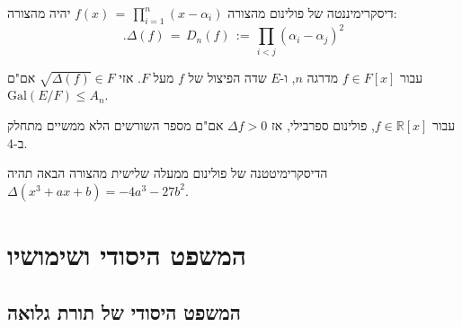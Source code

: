 \documentclass{tstextbook}
\begin{document}
\begin{definition}[דיסקרימיננטה]
דיסקרימיננטה של פולינום מהצורה \(f(x)\,=\,\prod_{i=1}^{n}(x-\alpha_{i})\) יהיה מהצורה:
$$.\Delta(f)\,=\,D_{n}(f)\,:=\,\prod_{i<j}(\alpha_{i}-\alpha_{j})^{2}$$

\end{definition}
\begin{proposition}
עבור \(f \in F[x]\) מדרגה \(n\), ו-\(E\) שדה הפיצול של \(f\) מעל \(F\). אזי \(\sqrt{ \Delta(f) } \in F\) אם"ם \(\mathrm{Gal}(E / F)\leq A_{n}\).

\end{proposition}
\begin{proposition}
עבור \(f \in \mathbb{R}[x]\), פולינום ספרבילי, אז \(\Delta f>0\) אם"ם מספר השורשים הלא ממשיים מתחלק ב-4.

\end{proposition}
\begin{proposition}
הדיסקרימיטטנה של פולינום ממעלה שלישית מהצורה הבאה תהיה \(\Delta\left(x^{3}+a x+b\right)=-4a^{3}-27b^{2}\).

\end{proposition}
\section{המשפט היסודי ושימושיו}

\subsection{המשפט היסודי של תורת גלואה}
\end{document}
